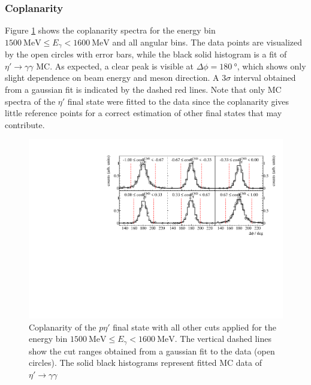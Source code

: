  \subsubsection{Coplanarity}
 Figure \ref{fig:copl} shows the coplanarity spectra for the energy bin $\SI{1500}{\mega\eV}\leq E_\gamma<\SI{1600}{\mega\eV}$ and all angular bins. The data points are visualized by the open circles with error bars, while the black solid histogram is a fit of $\eta'\to\gamma\gamma$ MC. As expected, a clear peak is visible at $\Delta\phi=\SI{180}{\degree}$, which shows only slight dependence on beam energy and meson direction. A $3\sigma$ interval obtained from a gaussian fit is indicated by the dashed red lines. Note that only MC spectra of the $\eta'$ final state were fitted to the data since the coplanarity gives little reference points for a correct estimation of other final states that may contribute. 
   \begin{figure}[htbp]
 	\centering
 	\includegraphics[width=\linewidth]{../figs/hydrogen/bin_cuts/phicut_ebin1.pdf}
 	\caption{Coplanarity of the $p\eta'$ final state with all other cuts applied for the energy bin $\SI{1500}{\mega\eV}\leq E_\gamma<\SI{1600}{\mega\eV}$. The vertical dashed lines show the cut ranges obtained from a gaussian fit to the data (open circles). The solid black histograms represent fitted MC data of $\eta'\to\gamma\gamma$}
 	\label{fig:copl}
 \end{figure}
